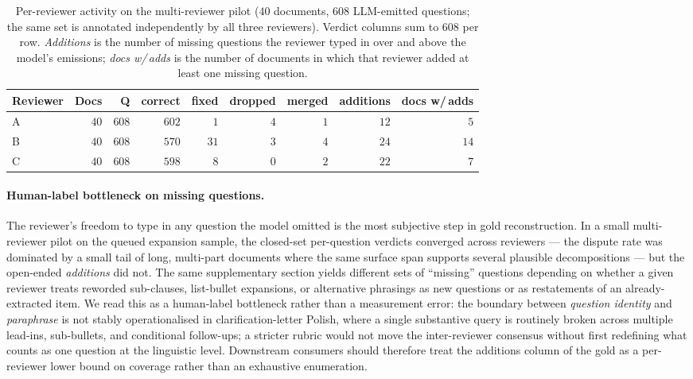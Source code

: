 \begin{table}[!htb]
\centering
\footnotesize
\begin{tabular}{@{}lrrrrrrrr@{}}
\toprule
Reviewer & Docs & Q & correct & fixed & dropped & merged & additions & docs w/\,adds \\
\midrule
A & $40$ & $608$ & $602$ & $1$  & $4$ & $1$ & $12$ & $5$  \\
B & $40$ & $608$ & $570$ & $31$ & $3$ & $4$ & $24$ & $14$ \\
C & $40$ & $608$ & $598$ & $8$  & $0$ & $2$ & $22$ & $7$  \\
\bottomrule
\end{tabular}
\caption{Per-reviewer activity on the multi-reviewer pilot
($40$ documents, $608$ LLM-emitted questions; the same set is
annotated independently by all three reviewers). Verdict columns
sum to $608$ per row. \emph{Additions} is the number of missing
questions the reviewer typed in over and above the model's
emissions; \emph{docs w/\,adds} is the number of documents in
which that reviewer added at least one missing question.}
\label{tab:per-reviewer}
\end{table}

\paragraph{Human-label bottleneck on missing questions.}
The reviewer's freedom to type in any question the model omitted is
the most subjective step in gold reconstruction. In a small
multi-reviewer pilot on the queued expansion sample, the closed-set
per-question verdicts converged across reviewers --- the dispute
rate was dominated by a small tail of long, multi-part documents
where the same surface span supports several plausible
decompositions --- but the open-ended \emph{additions} did not. The
same supplementary section yields different sets of ``missing''
questions depending on whether a given reviewer treats reworded
sub-clauses, list-bullet expansions, or alternative phrasings as new
questions or as restatements of an already-extracted item. We read
this as a human-label bottleneck rather than a measurement error:
the boundary between \emph{question identity} and \emph{paraphrase}
is not stably operationalised in clarification-letter Polish, where
a single substantive query is routinely broken across multiple
lead-ins, sub-bullets, and conditional follow-ups; a stricter rubric
would not move the inter-reviewer consensus without first
redefining what counts as one question at the linguistic level.
Downstream consumers should therefore treat the additions column of
the gold as a per-reviewer lower bound on coverage rather than an
exhaustive enumeration.

